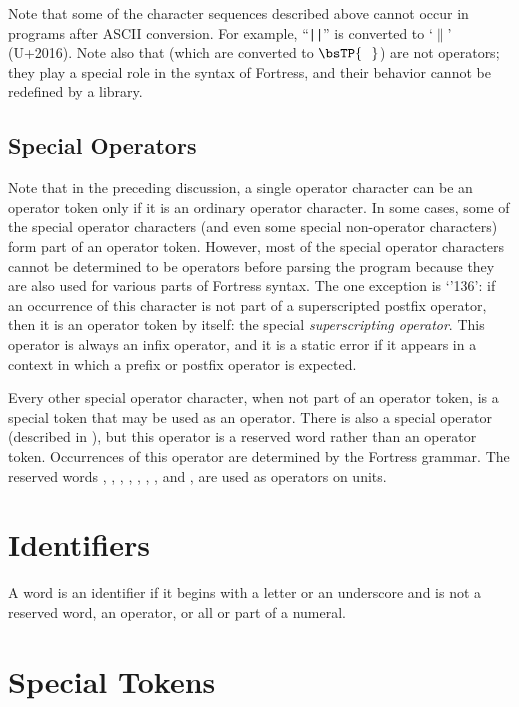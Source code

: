 Note that some of the character sequences described above
cannot occur in programs after ASCII conversion.
For example,
``\texttt{||}'' is converted to `$\|$' (U+2016).
Note also that 
(which are converted to $\bsTP{~~}$) are not operators;
they play a special role in the syntax of Fortress,
and their behavior cannot be redefined by a library.

\subsection{Special Operators}
Note that in the preceding discussion,
a single operator character can be an operator token
only if it is an ordinary operator character.
In some cases,
some of the special operator characters
(and even some special non-operator characters)
form part of an operator token.
However,
most of the special operator characters
cannot be determined to be operators
before parsing the program
because they are also used for various parts of Fortress syntax.
The one exception is `{\char'136}':
if an occurrence of this character is not part of
a superscripted postfix operator,
then it is an operator token by itself:
the special \emph{superscripting operator}.
This operator is always an infix operator,
and it is a static error
if it appears in a context in which a prefix or postfix operator is expected.

Every other special operator character,
when not part of an operator token,
is a special token
that may be used as an operator.
There is also a special  operator
(described in ),
but this operator is a reserved word
rather than an operator token.
Occurrences of this operator are determined by the Fortress grammar.
The reserved words ,
,
,
,
,
,
, and
, are used as operators on units.

\section{Identifiers}

A word is an identifier
if it begins with a letter or an underscore
and is not a reserved word, an operator,
or all or part of a numeral.

\section{Special Tokens}

